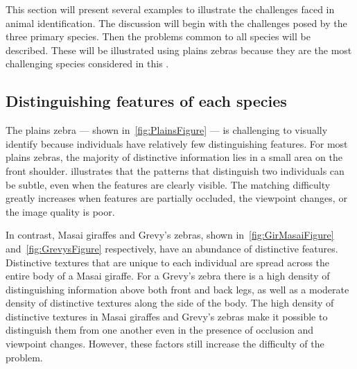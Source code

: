     This section will present several examples to illustrate the
      challenges faced in animal identification.
    The discussion will begin with the challenges posed by the three
      primary species.
    Then the problems common to all species will be described.
    These will be illustrated using plains zebras because they are the
      most challenging species considered in this \thesis{}.

    \subsection{Distinguishing features of each species}
        The plains zebra --- shown in~\cref{fig:PlainsFigure} --- is
          challenging to visually identify because individuals have
          relatively few distinguishing features.
        For most plains zebras, the majority of distinctive information
          lies in a small area on the front shoulder.
         illustrates that the patterns that
          distinguish two individuals can be subtle, even when the
          features are clearly visible.
        The matching difficulty greatly increases when features are
          partially occluded, the viewpoint changes, or the image quality
          is poor.

        In contrast, Masai giraffes and Grevy's zebras, shown
          in~\cref{fig:GirMasaiFigure} and~\cref{fig:GrevysFigure}
          respectively, have an abundance of distinctive features.
        Distinctive textures that are unique to each individual are
          spread across the entire body of a Masai giraffe.
        For a Grevy's zebra there is a high density of distinguishing
          information above both front and back legs, as well as a
          moderate density of distinctive textures along the side of the
          body.
        The high density of distinctive textures in Masai giraffes and
          Grevy's zebras make it possible to distinguish them from one
          another even in the presence of occlusion and viewpoint
          changes.
        However, these factors still increase the difficulty of the
          problem.

        \PlainsFigure{}

        \HardCaseFigure{}

        \GirMasaiFigure{}

        \GrevysFigure{}

